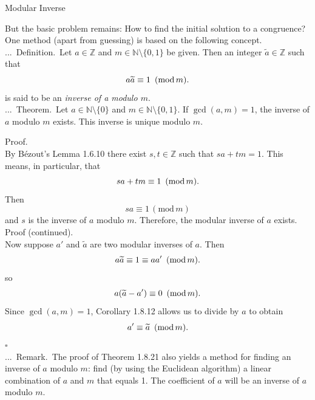 \documentclass[smaller,hyperref={CJKbookmarks=true}]{beamer}
\newcommand{\N}{\mathbb{N}} \newcommand{\Z}{\mathbb{Z}} \newcommand{\Q}{\mathbb{Q}}
\newenvironment{PROOF}{{\noindent\!\sf\alert{Proof.}}\\}{\hfill$\square$\\}
\newcounter{zhuo}[subsection]
\renewcommand{\thezhuo}{\thesection.\thesubsection.\arabic{zhuo}}
\newenvironment{DEFINITION}{\stepcounter{zhuo}\alert{\thezhuo.~Definition.\,}}{}
\newenvironment{REMARK}{\stepcounter{zhuo}\alert{\thezhuo.~Remark.\,}}{}
\newenvironment{THEOREM}{\stepcounter{zhuo}\alert{\thezhuo.~Theorem.\,}}{}
\begin{document}
\begin{frame}{Modular Inverse}
\begin{spacing}{1.1}
\vspace*{10pt}
But the basic problem remains: How to find the initial solution to a
congruence?\\[5pt]
One method (apart from guessing) is based on the following concept.\\[4pt]
\begin{DEFINITION}
Let $a\in\Z$ and $m\in\N\setminus\{0,1\}$ be given. Then an integer $\widetilde{a}\in\Z$ such that
\[a\widetilde{a}\equiv1\enskip(\text{mod}\,m).\]
is said to be an \emph{inverse of a modulo $m$}.\\[5pt]
\end{DEFINITION}
\begin{THEOREM}
Let $a\in\N\setminus\{0\}$ and $m\in\N\setminus\{0,1\}$. If $\gcd(a,m)=1$, the inverse of $a$ modulo $m$ exists. This inverse is unique modulo $m$.
\end{THEOREM}
\end{spacing}
\newpage
\begin{spacing}{1.05}
\vspace*{10pt}
\begin{PROOF}
By B\'{e}zout's Lemma 1.6.10 there exist $s,t\in\Z$ such that $sa+tm=1$. This means, in particular, that
\[sa+tm\equiv1\enskip(\text{mod}\,m).\]
Then
\begin{equation}\label{1.8.4}
 sa\equiv1\,(\text{mod}\,m)
\end{equation}
and $s$ is the inverse of $a$ modulo $m$. Therefore, the modular inverse of $a$ exists.
\newpage
\alert{Proof (continued).}\\
Now suppose $a'$ and $\widetilde{a}$ are two modular inverses of $a$. Then
\[a\widetilde{a}\equiv1\equiv aa'\enskip(\text{mod}\,m).\]
so
\[a(\widetilde{a}-a')\equiv0\enskip(\text{mod}\,m).\]
Since $\gcd(a,m)=1$, Corollary 1.8.12 allows us to divide by $a$ to obtain
\[a'\equiv\widetilde{a}\enskip(\text{mod}\,m).\]
\end{PROOF}
\begin{REMARK}
The proof of Theorem 1.8.21 also yields a method for
finding an inverse of $a$ modulo $m$: find (by using the Euclidean algorithm)
a linear combination of $a$ and $m$ that equals 1. The coefficient of $a$ will be
an inverse of $a$ modulo $m$.
\end{REMARK}
\end{spacing}
\end{frame}
\end{document}
